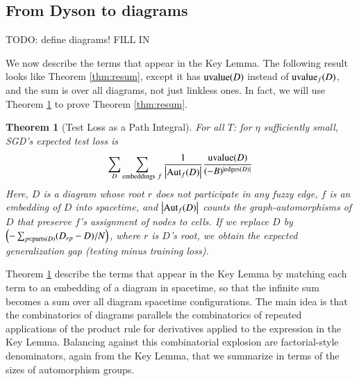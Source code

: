 \documentclass[anon,12pt]{colt2021} %
\newtheorem{thm}{Theorem}
\newcommand{\wrap}[1]{\left(#1\right)}
\newcommand{\wabs}[1]{\left|#1\right|}
\newcommand{\Aut}{\text{\textnormal{Aut}}}
\newcommand{\uvalue}{\text{\textnormal{uvalue}}}
\newcommand{\edges}{\text{\textnormal{edges}}}
\newcommand{\parts}{\text{\textnormal{parts}}}
\begin{document}
    \subsection{From Dyson to diagrams}                             \label{appendix:toward-diagrams}

        {\color{red} TODO: define diagrams! FILL IN }

        We now describe the terms that appear in the Key Lemma.  The following
        result looks like Theorem \ref{thm:resum}, except it has $\uvalue(D)$
        instead of $\uvalue_f(D)$, and the sum is over all diagrams, not just
        linkless ones.  In fact, we will use Theorem \ref{thm:pathint} to
        prove Theorem \ref{thm:resum}.

        \begin{thm}[Test Loss as a Path Integral] \label{thm:pathint}
            For all $T$: for $\eta$ sufficiently small, SGD's expected test
            loss is
            \begin{equation*}\label{eq:sgdcoef}
                \sum_{D}
                    \sum_{\text{embeddings}~f}
                    \frac{1}{\wabs{\Aut_f(D)}}
                \frac{\uvalue(D)}{(-B)^{|\edges(D)|}}
            \end{equation*}
            Here, $D$ is a diagram whose root $r$ does not participate in
            any fuzzy edge, $f$ is an embedding of $D$ into spacetime, and
            $\wabs{\Aut_f(D)}$ counts the graph-automorphisms of $D$ that
            preserve $f$'s assignment of nodes to cells.
            If we replace $D$ by 
            $
                \wrap{-\sum_{p \in \parts(D)} (D_{rp} - D)/N}
            $, where $r$ is $D$'s root,
            we obtain the expected generalization gap (testing minus training loss).
        \end{thm}

        Theorem \ref{thm:pathint} describe the terms that appear in the Key
        Lemma by matching each term to an embedding of a diagram in spacetime,
        so that the infinite sum becomes a sum over all diagram spacetime
        configurations.  The main idea is that the combinatorics of diagrams
        parallels the combinatorics of repeated applications of the product
        rule for derivatives applied to the expression in the Key Lemma.
        Balancing against this combinatorial explosion are factorial-style
        denominators, again from the Key Lemma, that we summarize in terms of
        the sizes of automorphism groups.
\end{document}
